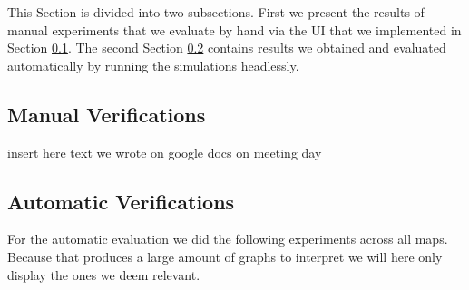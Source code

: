 This Section is divided into two subsections. First we present the results of manual experiments that we evaluate by hand via the UI that we implemented in Section \ref{sec:manualver}.
The second Section \ref{sec:autover} contains results we obtained and evaluated automatically by running the simulations headlessly.

\subsection{Manual Verifications}
\label{sec:manualver}
insert here text we wrote on google docs on meeting day


\subsection{Automatic Verifications}
\label{sec:autover}
For the automatic evaluation we did the following experiments across all maps. Because that produces a large amount of graphs to interpret we will here only display the ones we deem relevant.

